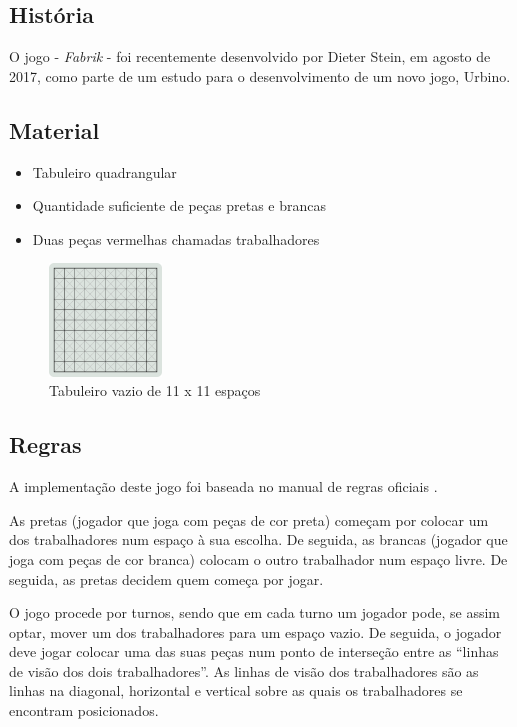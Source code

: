 \documentclass[a4paper]{article}
\begin{document}
\subsection{História}
O jogo - \textit{Fabrik} - foi recentemente desenvolvido por Dieter Stein, em agosto de 2017, como parte de um estudo para o desenvolvimento de um novo jogo, Urbino.

\subsection{Material}
\begin{itemize}
	\item Tabuleiro quadrangular
	\item Quantidade suficiente de peças pretas e brancas
	\item Duas peças vermelhas chamadas trabalhadores
\end{itemize}

\begin{figure}[h!]
\begin{center}
\includegraphics[height=3cm,width=3cm]{images/fabrik_empty_board.png}
\caption{Tabuleiro vazio de 11 x 11 espaços}
\end{center}
\end{figure}

\subsection{Regras}
A implementação deste jogo foi baseada no manual de regras oficiais \cite{games_and_puzzles_by_dieter_stein}.

As pretas (jogador que joga com peças de cor preta) começam por colocar um dos trabalhadores num espaço à sua escolha. De seguida, as brancas (jogador que joga com peças de cor branca) colocam o outro trabalhador num espaço livre. De seguida, as pretas decidem quem começa por jogar.

O jogo procede por turnos, sendo que em cada turno um jogador pode, se assim optar, mover um dos trabalhadores para um espaço vazio. De seguida, o jogador deve jogar colocar uma das suas peças num ponto de interseção entre as “linhas de visão dos dois trabalhadores”. As linhas de visão dos trabalhadores são as linhas na diagonal, horizontal e vertical sobre as quais os trabalhadores se encontram posicionados.
\end{document}
